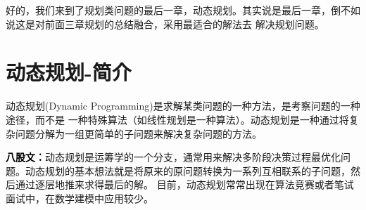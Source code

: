 \documentclass[a4paper,20pt]{article}
\title{}
\author{}
\date{}
\begin{document}
\renewcommand{\lstlistlistingname}{代码汇总}
\renewcommand{\lstlistingname}{代码}
\renewcommand\tablename{表}
好的，我们来到了规划类问题的最后一章，动态规划。其实说是最后一章，倒不如说这是对前面三章规划的总结融合，采用最适合的解法去
解决规划问题。
\section{动态规划-简介}
动态规划(Dynamic Programming)是求解某类问题的一种方法，是考察问题的一种途径，而不是
一种特殊算法（如线性规划是一种算法）。动态规划是一种通过将复杂问题分解为一组更简单的子问题来解决复杂问题的方法。
\par \textbf{\textcolor{black}{八股文：}}动态规划是运筹学的一个分支，通常用来解决多阶段决策过程最优化问题。动态规划的基本想法就是将原来的原问题转换为一系列互相联系的子问题，然后通过逐层地推来求得最后的解。
目前，动态规划常常出现在算法竞赛或者笔试面试中，在数学建模中应用较少。
\end{document}
